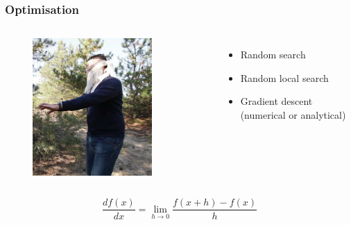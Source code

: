 \begin{frame}
	\frametitle{Optimisation}

	\begin{columns}
		
		\begin{figure}
	                \includegraphics[width=0.8\textwidth]{Pics/hiker.png}
        	\end{figure}
		\begin{itemize}
			\item Random search
			\item Random local search
			\item Gradient descent (numerical or analytical)
		\end{itemize}

	\end{columns}

	\vskip 1cm
	\begin{equation*}
		\frac{df(x)}{dx} = \lim_{h \rightarrow 0} \frac{f(x+h)-f(x)}{h}
	\end{equation*}

\end{frame}

